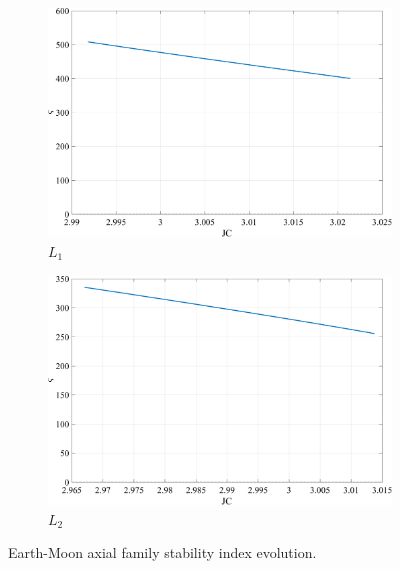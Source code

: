 \begin{figure}[H]
    \begin{subfigure}[h]{0.4\linewidth}
        \includegraphics[width=\textwidth]{figures/L1AxialStability.pdf}
        \caption{$L_{1}$}
    \end{subfigure}
    \hfill
    \begin{subfigure}[h]{0.4\linewidth}
        \includegraphics[width=\textwidth]{figures/L2AxialStability.pdf}
        \caption{$L_{2}$}
    \end{subfigure}
    \caption{Earth-Moon axial family stability index evolution.}
    \label{fig:axialStability}
\end{figure}

